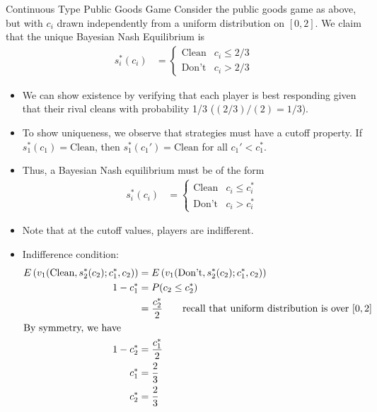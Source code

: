 \documentclass[10pt]{extarticle}
\begin{document}
  \begin{problem}{Continuous Type Public Goods Game}
    Consider the public goods game as above, but with $c_i$ drawn independently from a uniform distribution on $[0,2]$. We claim that the unique Bayesian Nash Equilibrium is
    \begin{align*}
      s_i^{\ast}(c_i) &= \begin{cases}
        \text{Clean} & c_i \leq 2/3\\
        \text{Don't} & c_i > 2/3
      \end{cases}
    \end{align*}
    \begin{itemize}
      \item We can show existence by verifying that each player is best responding given that their rival cleans with probability 1/3 ($(2/3)/(2) = 1/3$).
      \item To show uniqueness, we observe that strategies must have a cutoff property. If $s_1^{\ast}(c_1) = \text{Clean}$, then $s_1^{\ast}(c_1') = \text{Clean}$ for all $c_1' < c_1^{\ast}$.
      \item Thus, a Bayesian Nash equilibrium must be of the form
        \begin{align*}
          s_i^{\ast}(c_i) &= \begin{cases}
            \text{Clean} & c_i \leq c_i^{\ast}\\
            \text{Don't} & c_i > c_i^{\ast}
          \end{cases}
        \end{align*}
      \item Note that at the cutoff values, players are indifferent.
      \item Indifference condition:
        \begin{align*}
          E\left(v_1(\text{Clean},s_2^{\ast}(c_2);c_1^{\ast},c_2)\right) &= E\left(v_1(\text{Don't},s_2^{\ast}(c_2);c_1^{\ast},c_2)\right)\\
          1-c_1^{\ast} &= P(c_2\leq c_{2}^{\ast})\\
                       &= \frac{c_2^{\ast}}{2} \tag*{recall that uniform distribution is over $[0,2]$}\\
                       \shortintertext{By symmetry, we have}
          1-c_2^{\ast} &= \frac{c_1^{\ast}}{2}\\
          c_1^{\ast} &= \frac{2}{3}\\
          c_2^{\ast} &= \frac{2}{3}
        \end{align*}
    \end{itemize}
  \end{problem}
\end{document}

